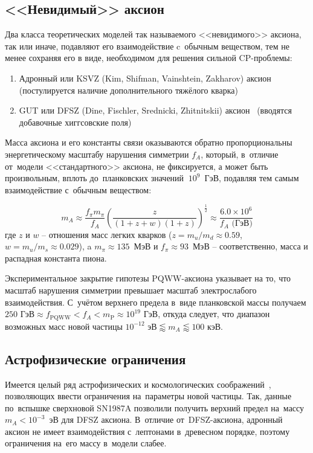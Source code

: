 \documentclass[a4paper,article,14pt]{extarticle}
\begin{document}
\subsection{<<Невидимый>> аксион}
Два класса теоретических моделей так называемого <<невидимого>> аксиона, так или иначе, подавляют его взаимодействие c~обычным веществом, тем не менее сохраняя его в виде, необходимом для решения сильной CP-проблемы:
\begin{enumerate}
    \item Адронный или KSVZ (Kim, Shifman, Vainshtein, Zakharov) аксион~\cite{K,SVZ} (постулируется наличие дополнительного тяжёлого кварка)
    \item GUT или DFSZ (Dine, Fischler, Srednicki, Zhitnitskii) аксион~\cite{DFS,Z} (вводятся добавочные хиггсовские поля)
\end{enumerate}
Масса аксиона и его константы связи оказываются обратно пропорциональны энергетическому масштабу нарушения симметрии $f_A$, который, в~отличие от~модели <<стандартного>> аксиона, не фиксируется, а может быть произвольным, вплоть до~планковских значений $~10^9$~ГэВ, подавляя тем самым взаимодействие с~обычным веществом:

\begin{equation}\label{mA}
    m_A \approx
    \frac{f_\pi m_\pi}{f_A}
    \left(
    \frac{z}{(1 + z +w) (1 + z)}
    \right)^{\frac{1}{2}} \approx
    \frac{6.0 \times 10^6}{f_A \text{\ (ГэВ})}
\end{equation}
где $z$ и $w$ -- отношения масс легких кварков ($z = m_u/m_d \approx 0.59$, $w = m_u/m_s \approx 0.029$), a $m_{\pi} \approx 135$~МэВ и $f_{\pi} \approx 93$~МэВ -- соответственно, масса и распадная константа пиона.

Экспериментальное закрытие гипотезы PQWW-аксиона указывает на то, что масштаб нарушения симметрии превышает масштаб электрослабого взаимодействия.
С~учётом верхнего предела в~виде планковской массы получаем $250 \text{ ГэВ} \approx f_{\text{PQWW}} < f_A < m_{\mathrm{P}} \approx 10^{19} \text{ ГэВ} $, откуда следует, что диапазон возможных масс новой частицы $10^{-12} \text{\ эВ} \lessapprox m_A \lessapprox 100 \text{\ кэВ}$.

\subsection{Астрофизические ограничения}
Имеется целый ряд астрофизических и космологических соображений~\cite{turner1990windows,Raffelt:1995ym,raffelt1990astrophysical}, позволяющих ввести ограничения на~параметры новой частицы.
Так, данные по~вспышке сверхновой SN1987A позволили получить верхний предел на~массу $m_A < 10^{-3}$~эВ для DFSZ аксиона.
В~отличие от~DFSZ-аксиона, адронный аксион не имеет взаимодействия с~лептонами в~древесном порядке, поэтому ограничения на~его массу в~модели слабее.
\end{document}

